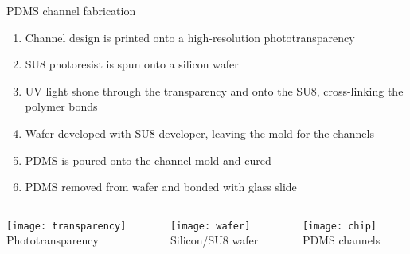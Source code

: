 \begin{frame}[c]{PDMS channel fabrication}

	\vspace{-.1in}
	{\footnotesize
	\begin{enumerate}
		\item Channel design is printed onto a high-resolution phototransparency
		\item SU8 photoresist is spun onto a silicon wafer
		\item UV light shone through the transparency and onto the SU8, cross-linking the polymer bonds
		\item Wafer developed with SU8 developer, leaving the mold for the channels
		\item PDMS is poured onto the channel mold and cured
		\item PDMS removed from wafer and bonded with glass slide
	\end{enumerate}
	}
	
	
	\begin{columns}[t]
		\begin{column}[T]{1.67in}
			{\centering
				\texttt{[image: transparency]} \\
				Phototransparency \\
				\par
			}
		\end{column}
		
		\begin{column}[T]{1.67in}
			{\centering
				\texttt{[image: wafer]} \\
				Silicon/SU8 wafer \\
				\par
			}
		\end{column}
		
		\begin{column}[T]{1.67in}
			{\centering
				\texttt{[image: chip]} \\
				PDMS channels
				\par
			}
		\end{column}

	\end{columns}


\end{frame}




